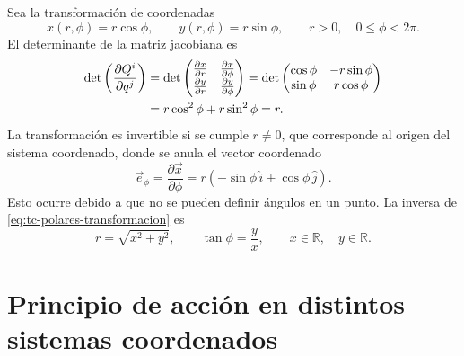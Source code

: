 \documentclass[../apunte_mecanica_clasica.tex]{subfiles}
\begin{document}
Sea la transformación de coordenadas
\begin{equation}
    x(r,\phi)=r\cos\phi,
    \qquad
    y(r,\phi)=r\sin\phi,
    \qquad
    r>0,
    \quad
    0\leq \phi<2\pi.
    \label{eq:tc-polares-transformacion}
\end{equation}
El determinante de la matriz jacobiana es
\begin{align}
    \det\left(\frac{\partial Q^i}{\partial q^j}\right)
    &=
    \det
    \begin{pmatrix}
        \frac{\partial x}{\partial r} & \frac{\partial x}{\partial \phi} \\
        \frac{\partial y}{\partial r} & \frac{\partial y}{\partial \phi}
    \end{pmatrix}                                                        
    =
    \det
    \begin{pmatrix}
        \cos\phi & -r\sin\phi \\
        \sin\phi & r\cos\phi
    \end{pmatrix}                                                        
    \notag\\
    &=r\cos^2\phi+r\sin^2\phi
      =r.
    \label{eq:tc-jacobiano-polares}
\end{align}
La transformación es invertible si se cumple \(r\neq 0\), que corresponde al origen del sistema coordenado, donde se anula el vector coordenado
\begin{equation}
    \vec e_\phi=\frac{\partial \vec x}{\partial \phi}
    =r\left(-\sin\phi\,\hat i+\cos\phi\,\hat j\right).
    \label{eq:tc-vector-ephi}
\end{equation}
Esto ocurre debido a que no se pueden definir ángulos en un punto. La inversa de \eqref{eq:tc-polares-transformacion} es
\begin{equation}
    r=\sqrt{x^2+y^2},
    \qquad
    \tan\phi=\frac{y}{x},
    \qquad
    x\in\mathbb{R},
    \quad
    y\in\mathbb{R}.
    \label{eq:tc-inversa-polares}
\end{equation}

\section{Principio de acción en distintos sistemas coordenados}
\label{sec:tc-accion-dos-coordenadas}
\end{document}
